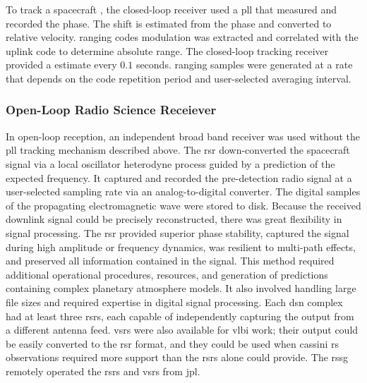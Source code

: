\documentclass{article}
\theoremstyle{mystyle}
\begin{document}
To track a spacecraft , the \gls{closed-loop} receiver used a \gls{pll} that measured and recorded the  \gls{phase}. The  shift is estimated from the phase and converted to relative velocity. \Glspl{ranging code} \gls{modulation} was extracted and correlated with the \gls{uplink} code to determine \gls{absolute range}. The \gls{closed-loop} tracking receiver provided a  estimate every $0.1$ seconds. \Glspl{ranging sample} were generated at a rate that depends on the code repetition period and user-selected averaging interval.

\subsubsection{\footnotesize Open-Loop Radio Science Receiever \label{subsubsec:usr_open_loop_rad_sci_rec}}

In \gls{open-loop} reception, an independent broad band receiver was used without the \gls{pll} tracking mechanism described above. The \gls{rsr} down-converted the spacecraft signal via a local \gls{oscillator} \gls{heterodyne} process guided by a prediction of the expected \gls{frequency}. It captured and recorded the pre-detection radio signal at a user-selected \gls{sampling rate} via an \gls{analog-to-digital converter}. The digital samples of the propagating electromagnetic wave were stored to disk. Because the received \gls{downlink} signal could be precisely reconstructed, there was great flexibility in signal processing. The \gls{rsr} provided superior \gls{phase stability}, captured the signal during high \gls{amplitude} or \gls{frequency} dynamics, was resilient to \glspl{multi-path effect}, and preserved all information contained in the signal. This method required additional operational procedures, resources, and generation of predictions containing complex planetary atmosphere models. It also involved handling large file sizes and required expertise in digital signal processing. Each \gls{dsn} complex had at least three \glspl{rsr}, each capable of independently capturing the output from a different antenna feed.
\glspl{vsr} were also available for \gls{vlbi} work; their output could be easily converted to the \gls{rsr} format, and they could be used when \gls{cassini} \gls{rs} observations required more support than the \glspl{rsr} alone could provide. The \gls{rssg} remotely operated the \glspl{rsr} and \gls{vsr}s from \gls{jpl}.
\end{document}
